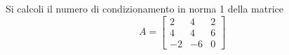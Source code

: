 Si calcoli il numero di condizionamento in norma 1 della matrice
\bigskip
\[
A=\left[
\begin{array}{ccc}
2 & 4 & 2 \\
4 & 4 & 6\\
-2 & -6 & 0
\end{array}\right]
\]
